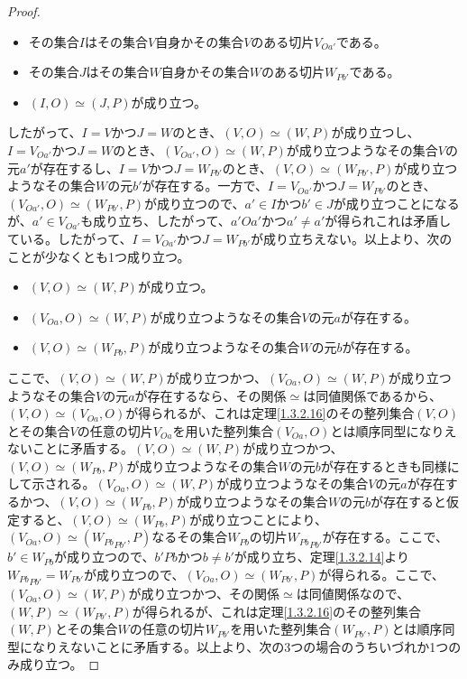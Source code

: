 \documentclass[dvipdfmx]{jsarticle}
\begin{document}
\begin{proof}
\begin{itemize}
\item
  その集合$I$はその集合$V$自身かその集合$V$のある切片$V_{Oa'}$である。
\item
  その集合$J$はその集合$W$自身かその集合$W$のある切片$W_{Pb'}$である。
\item
  $(I,O) \simeq (J,P)$が成り立つ。
\end{itemize}\par
したがって、$I = V$かつ$J = W$のとき、$(V,O) \simeq (W,P)$が成り立つし、$I = V_{Oa'}$かつ$J = W$のとき、$\left( V_{Oa'},O \right) \simeq (W,P)$が成り立つようなその集合$V$の元$a'$が存在するし、$I = V$かつ$J = W_{Pb'}$のとき、$(V,O) \simeq \left( W_{Pb'},P \right)$が成り立つようなその集合$W$の元$b'$が存在する。一方で、$I = V_{Oa'}$かつ$J = W_{Pb'}$のとき、$\left( V_{Oa'},O \right) \simeq \left( W_{Pb'},P \right)$が成り立つので、$a' \in I$かつ$b' \in J$が成り立つことになるが、$a' \in V_{Oa'}$も成り立ち、したがって、$a'Oa'$かつ$a' \neq a'$が得られこれは矛盾している。したがって、$I = V_{Oa'}$かつ$J = W_{Pb'}$が成り立ちえない。以上より、次のことが少なくとも1つ成り立つ。
\begin{itemize}
\item
  $(V,O) \simeq (W,P)$が成り立つ。
\item
  $\left( V_{Oa},O \right) \simeq (W,P)$が成り立つようなその集合$V$の元$a$が存在する。
\item
  $(V,O) \simeq \left( W_{Pb},P \right)$が成り立つようなその集合$W$の元$b$が存在する。
\end{itemize}
ここで、$(V,O) \simeq (W,P)$が成り立つかつ、$\left( V_{Oa},O \right) \simeq (W,P)$が成り立つようなその集合$V$の元$a$が存在するなら、その関係$\simeq$は同値関係であるから、$(V,O) \simeq \left( V_{Oa},O \right)$が得られるが、これは定理\ref{1.3.2.16}のその整列集合$(V,O)$とその集合$V$の任意の切片$V_{Oa}$を用いた整列集合$\left( V_{Oa},O \right)$とは順序同型になりえないことに矛盾する。$(V,O) \simeq (W,P)$が成り立つかつ、$(V,O) \simeq \left( W_{Pb},P \right)$が成り立つようなその集合$W$の元$b$が存在するときも同様にして示される。$\left( V_{Oa},O \right) \simeq (W,P)$が成り立つようなその集合$V$の元$a$が存在するかつ、$(V,O) \simeq \left( W_{Pb},P \right)$が成り立つようなその集合$W$の元$b$が存在すると仮定すると、$(V,O) \simeq \left( W_{Pb},P \right)$が成り立つことにより、$\left( V_{Oa},O \right) \simeq \left( {W_{Pb}}_{Pb'},P \right)$なるその集合$W_{Pb}$の切片${W_{Pb}}_{Pb'}$が存在する。ここで、$b' \in W_{Pb}$が成り立つので、$b'Pb$かつ$b \neq b'$が成り立ち、定理\ref{1.3.2.14}より${W_{Pb}}_{Pb'} = W_{Pb'}$が成り立つので、$\left( V_{Oa},O \right) \simeq \left( W_{Pb'},P \right)$が得られる。ここで、$\left( V_{Oa},O \right) \simeq (W,P)$が成り立つかつ、その関係$\simeq$は同値関係なので、$(W,P) \simeq \left( W_{Pb'},P \right)$が得られるが、これは定理\ref{1.3.2.16}のその整列集合$(W,P)$とその集合$W$の任意の切片$W_{Pb'}$を用いた整列集合$\left( W_{Pb'},P \right)$とは順序同型になりえないことに矛盾する。以上より、次の3つの場合のうちいづれか1つのみ成り立つ。

\end{proof}
\end{document}
